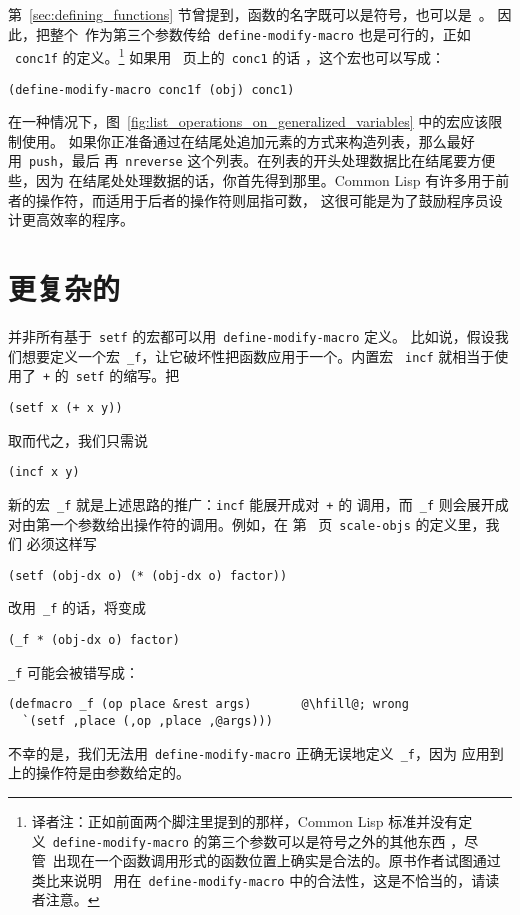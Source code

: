 第~\ref{sec:defining_functions} 节曾提到，函数的名字既可以是符号，也可以是~\lexpr。
因此，把整个~\lexpr 作为第三个参数传给~\verb|define-modify-macro| 也是可行的，正如
~\verb|conc1f| 的定义。\footnote{译者注：正如前面两个脚注里提到的那样，Common
Lisp 标准并没有定义~\texttt{define-modify-macro} 的第三个参数可以是符号之外的其他东西
，尽管~\lexpr 出现在一个函数调用形式的函数位置上确实是合法的。原书作者试图通过类比来说明
~\lexpr 用在~\texttt{define-modify-macro} 中的合法性，这是不恰当的，请读者注意。}
如果用~\pageref{fig:small_functions_which_operate_on_lists} 页上的~\verb|conc1| 的话
，这个宏也可以写成：
\begin{lstlisting}
(define-modify-macro conc1f (obj) conc1)
\end{lstlisting}

在一种情况下，图~\ref{fig:list_operations_on_generalized_variables} 中的宏应该限制使用。
如果你正准备通过在结尾处追加元素的方式来构造列表，那么最好用~\verb|push|，最后
再~\verb|nreverse| 这个列表。在列表的开头处理数据比在结尾要方便些，因为
在结尾处处理数据的话，你首先得到那里。Common Lisp 有许多用于前者的操作符，而适用于后者的操作符则屈指可数，
这很可能是为了鼓励程序员设计更高效率的程序。

\section{更复杂的\utility{}}
\label{sec:more_complex_utilities}

并非所有基于~\verb|setf| 的宏都可以用~\verb|define-modify-macro| 定义。
比如说，假设我们想要定义一个宏~\verb|_f|，让它破坏性把函数应用于一个\gv{}。内置宏
~\verb|incf| 就相当于使用了~\verb|+| 的~\verb|setf| 的缩写。把
\begin{lstlisting}
(setf x (+ x y))
\end{lstlisting}
取而代之，我们只需说
\begin{lstlisting}
(incf x y)
\end{lstlisting}
新的宏~\verb|_f| 就是上述思路的推广：\verb|incf| 能展开成对~\verb|+| 的
调用，而~\verb|_f| 则会展开成对由第一个参数给出操作符的调用。例如，在
第~\pageref{fig:original_move_and_scale} 页~\verb|scale-objs| 的定义里，我们
必须这样写
\begin{lstlisting}
(setf (obj-dx o) (* (obj-dx o) factor))
\end{lstlisting}
改用~\verb|_f| 的话，将变成
\begin{lstlisting}
(_f * (obj-dx o) factor)
\end{lstlisting}
\verb|_f| 可能会被错写成：
\begin{lstlisting}[escapechar=\@]
(defmacro _f (op place &rest args)       @\hfill@; wrong
  `(setf ,place (,op ,place ,@args)))
\end{lstlisting}
不幸的是，我们无法用~\verb|define-modify-macro| 正确无误地定义~\verb|_f|，因为
应用到\gv{}上的操作符是由参数给定的。

